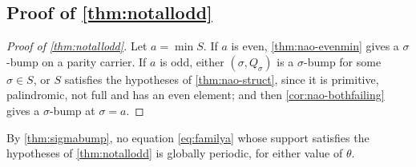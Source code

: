 \subsection{Proof of \autoref{thm:notallodd}}

\begin{proof}[Proof of \autoref{thm:notallodd}]
Let $a=\min S$. If $a$ is even, \autoref{thm:nao-evenmin} gives a
$\sigma$-bump on a parity carrier. If $a$ is odd, either
$(\sigma,Q_\sigma)$ is a $\sigma$-bump for some $\sigma\in S$, or $S$
satisfies the hypotheses of \autoref{thm:nao-struct}, since it is primitive,
palindromic, not full and has an even element; and then
\autoref{cor:nao-bothfailing} gives a $\sigma$-bump at $\sigma=a$.
\end{proof}

By \autoref{thm:sigmabump}, no equation \eqref{eq:familya} whose support
satisfies the hypotheses of \autoref{thm:notallodd} is globally periodic,
for either value of $\theta$.
